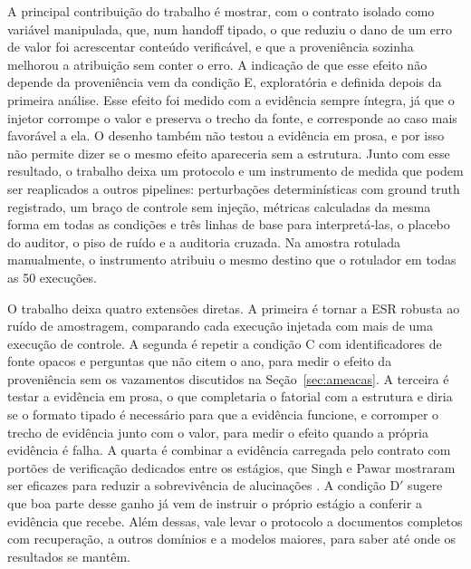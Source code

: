A principal contribuição do trabalho é mostrar, com o contrato isolado como variável manipulada, que, num handoff tipado, o que reduziu o dano de um erro de valor foi acrescentar conteúdo verificável, e que a proveniência sozinha melhorou a atribuição sem conter o erro.
A indicação de que esse efeito não depende da proveniência vem da condição E, exploratória e definida depois da primeira análise.
Esse efeito foi medido com a evidência sempre íntegra, já que o injetor corrompe o valor e preserva o trecho da fonte, e corresponde ao caso mais favorável a ela.
O desenho também não testou a evidência em prosa, e por isso não permite dizer se o mesmo efeito apareceria sem a estrutura.
Junto com esse resultado, o trabalho deixa um protocolo e um instrumento de medida que podem ser reaplicados a outros pipelines: perturbações determinísticas com ground truth registrado, um braço de controle sem injeção, métricas calculadas da mesma forma em todas as condições e três linhas de base para interpretá-las, o placebo do auditor, o piso de ruído e a auditoria cruzada.
Na amostra rotulada manualmente, o instrumento atribuiu o mesmo destino que o rotulador em todas as 50 execuções.

O trabalho deixa quatro extensões diretas.
A primeira é tornar a ESR robusta ao ruído de amostragem, comparando cada execução injetada com mais de uma execução de controle.
A segunda é repetir a condição C com identificadores de fonte opacos e perguntas que não citem o ano, para medir o efeito da proveniência sem os vazamentos discutidos na Seção~\ref{sec:ameacas}.
A terceira é testar a evidência em prosa, o que completaria o fatorial com a estrutura e diria se o formato tipado é necessário para que a evidência funcione, e corromper o trecho de evidência junto com o valor, para medir o efeito quando a própria evidência é falha.
A quarta é combinar a evidência carregada pelo contrato com portões de verificação dedicados entre os estágios, que Singh e Pawar mostraram ser eficazes para reduzir a sobrevivência de alucinações \cite{singh2026snowball}. A condição D$'$ sugere que boa parte desse ganho já vem de instruir o próprio estágio a conferir a evidência que recebe.
Além dessas, vale levar o protocolo a documentos completos com recuperação, a outros domínios e a modelos maiores, para saber até onde os resultados se mantêm.
